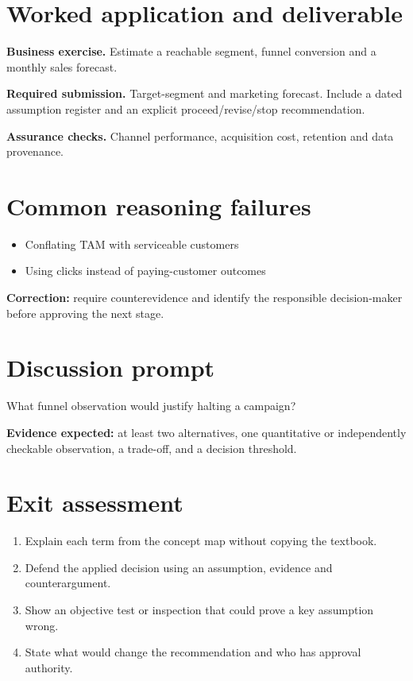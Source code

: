 \documentclass[11pt,letterpaper]{article}
\begin{document}
\section{Worked application and deliverable}
\textbf{Business exercise.} Estimate a reachable segment, funnel conversion and a monthly sales forecast.\par\textbf{Required submission.} Target-segment and marketing forecast. Include a dated assumption register and an explicit proceed/revise/stop recommendation.\par\textbf{Assurance checks.} Channel performance, acquisition cost, retention and data provenance.
\section{Common reasoning failures}
\begin{itemize}[leftmargin=*,itemsep=3pt]
\item Conflating TAM with serviceable customers
\item Using clicks instead of paying-customer outcomes
\end{itemize}
\noindent\textbf{Correction:} require counterevidence and identify the responsible decision-maker before approving the next stage.
\section{Discussion prompt}
What funnel observation would justify halting a campaign?\par\medskip\textbf{Evidence expected:} at least two alternatives, one quantitative or independently checkable observation, a trade-off, and a decision threshold.
\section{Exit assessment}
\begin{enumerate}[leftmargin=*,itemsep=5pt]
\item Explain each term from the concept map without copying the textbook.
\item Defend the applied decision using an assumption, evidence and counterargument.
\item Show an objective test or inspection that could prove a key assumption wrong.
\item State what would change the recommendation and who has approval authority.
\end{enumerate}

\end{document}
